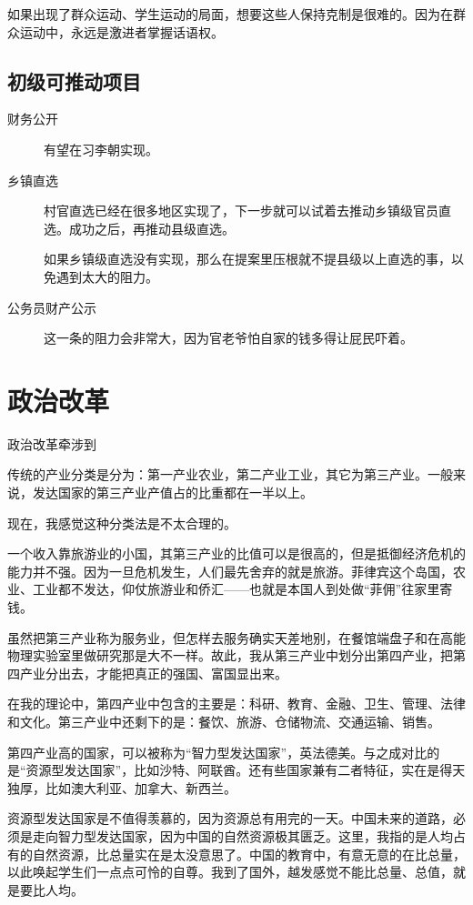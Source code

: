 如果出现了群众运动、学生运动的局面，想要这些人保持克制是很难的。因为在群众运动中，永远是激进者掌握话语权。




\subsection{初级可推动项目}

\begin{description}
\item[财务公开] 有望在习李朝实现。
\item[乡镇直选] 村官直选已经在很多地区实现了，下一步就可以试着去推动乡镇级官员直选。成功之后，再推动县级直选。

如果乡镇级直选没有实现，那么在提案里压根就不提县级以上直选的事，以免遇到太大的阻力。
\item[公务员财产公示] 这一条的阻力会非常大，因为官老爷怕自家的钱多得让屁民吓着。
\end{description}

\section{政治改革}
政治改革牵涉到


传统的产业分类是分为：第一产业农业，第二产业工业，其它为第三产业。一般来说，发达国家的第三产业产值占的比重都在一半以上。

现在，我感觉这种分类法是不太合理的。

一个收入靠旅游业的小国，其第三产业的比值可以是很高的，但是抵御经济危机的能力并不强。因为一旦危机发生，人们最先舍弃的就是旅游。菲律宾这个岛国，农业、工业都不发达，仰仗旅游业和侨汇——也就是本国人到处做“菲佣”往家里寄钱。

虽然把第三产业称为服务业，但怎样去服务确实天差地别，在餐馆端盘子和在高能物理实验室里做研究那是大不一样。故此，我从第三产业中划分出第四产业，把第四产业分出去，才能把真正的强国、富国显出来。

在我的理论中，第四产业中包含的主要是：科研、教育、金融、卫生、管理、法律和文化。第三产业中还剩下的是：餐饮、旅游、仓储物流、交通运输、销售。

第四产业高的国家，可以被称为“智力型发达国家”，英法德美。与之成对比的是“资源型发达国家”，比如沙特、阿联酋。还有些国家兼有二者特征，实在是得天独厚，比如澳大利亚、加拿大、新西兰。

资源型发达国家是不值得羡慕的，因为资源总有用完的一天。中国未来的道路，必须是走向智力型发达国家，因为中国的自然资源极其匮乏。这里，我指的是人均占有的自然资源，比总量实在是太没意思了。中国的教育中，有意无意的在比总量，以此唤起学生们一点点可怜的自尊。我到了国外，越发感觉不能比总量、总值，就是要比人均。


